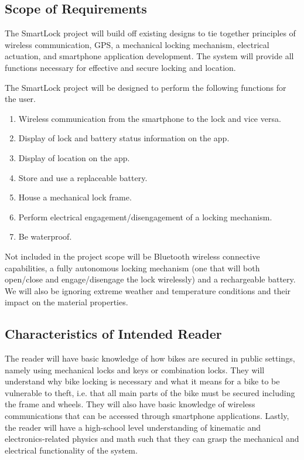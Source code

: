 \documentclass[12pt]{article}
\begin{document}
\subsection{Scope of Requirements} 

The SmartLock project will build off existing designs to tie together principles of wireless communication, GPS, a mechanical locking mechanism, electrical actuation, and smartphone application development. The system will provide all functions necessary for effective and secure locking and location.  

The SmartLock project will be designed to perform the following functions for the user.  

\begin{enumerate}
\item Wireless communication from the smartphone to the lock and vice versa. 
\item Display of lock and battery status information on the app. 
\item Display of location on the app. 
\item Store and use a replaceable battery. 
\item House a mechanical lock frame. 
\item Perform electrical engagement/disengagement of a locking mechanism. 
\item Be waterproof. 
\end{enumerate}

Not included in the project scope will be Bluetooth wireless connective capabilities, a fully autonomous locking mechanism (one that will both open/close and engage/disengage the lock wirelessly) and a rechargeable battery. We will also be ignoring extreme weather and temperature conditions and their impact on the material properties.

\subsection{Characteristics of Intended Reader} \label{sec_IntendedReader}

The reader will have basic knowledge of how bikes are secured in public settings, namely using mechanical locks and keys or combination locks. They will understand why bike locking is necessary and what it means for a bike to be vulnerable to theft, i.e. that all main parts of the bike must be secured including the frame and wheels. They will also have basic knowledge of wireless communications that can be accessed through smartphone applications. Lastly, the reader will have a high-school level understanding of kinematic and electronics-related physics and math such that they can grasp the mechanical and electrical functionality of the system.  
\end{document}
